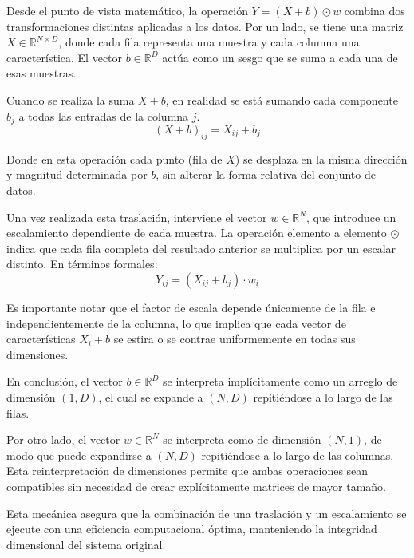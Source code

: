 ﻿\documentclass[12pt]{article}
\begin{document}
Desde el punto de vista matemático, la operación $Y = (X + b) \odot w$ combina dos transformaciones distintas aplicadas a los datos. Por un lado, se tiene una matriz $X \in \mathbb{R}^{N \times D}$, donde cada fila representa una muestra y cada columna una característica. El vector $b \in \mathbb{R}^D$ actúa como un sesgo que se suma a cada una de esas muestras.

Cuando se realiza la suma $X + b$, en realidad se está sumando cada componente $b_j$ a todas las entradas de la columna $j$. 
$$
    (X + b)_{ij} = X_{ij} + b_j
$$

Donde en esta operación cada punto (fila de $X$) se desplaza en la misma dirección y magnitud determinada por $b$, sin alterar la forma relativa del conjunto de datos.

Una vez realizada esta traslación, interviene el vector $w \in \mathbb{R}^N$, que introduce un escalamiento dependiente de cada muestra. La operación elemento a elemento $\odot$ indica que cada fila completa del resultado anterior se multiplica por un escalar distinto. En términos formales:
$$
    Y_{ij} = (X_{ij} + b_j) \cdot w_i
$$

Es importante notar que el factor de escala depende únicamente de la fila e independientemente de la columna, lo que implica que cada vector de características $X_i + b$ se estira o se contrae uniformemente en todas sus dimensiones.


En conclusión, el vector $b \in \mathbb{R}^D$ se interpreta implícitamente como un arreglo de dimensión $(1, D)$, el cual se expande a $(N, D)$ repitiéndose a lo largo de las filas. 

Por otro lado, el vector $w \in \mathbb{R}^N$ se interpreta como de dimensión $(N, 1)$, de modo que puede expandirse a $(N, D)$ repitiéndose a lo largo de las columnas. Esta reinterpretación de dimensiones permite que ambas operaciones sean compatibles sin necesidad de crear explícitamente matrices de mayor tamaño.

Esta mecánica asegura que la combinación de una traslación y un escalamiento se ejecute con una eficiencia computacional óptima, manteniendo la integridad dimensional del sistema original.
\end{document}
